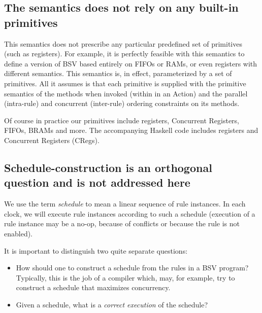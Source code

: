 \documentclass[11pt]{article}
\begin{document}

\subsection{The semantics does not rely on any built-in primitives}

This semantics does not prescribe any particular predefined set of
primitives (such as registers).  For example, it is perfectly feasible
with this semantics to define a version of BSV based entirely on FIFOs
or RAMs, or even registers with different semantics.  This semantics
is, in effect, parameterized by a set of primitives.  All it assumes
is that each primitive is supplied with the primitive semantics of the
methods when invoked (within in an Action) and the parallel
(intra-rule) and concurrent (inter-rule) ordering constraints on its
methods.

Of course in practice our primitives include registers, Concurrent
Registers, FIFOs, BRAMs and more.  The accompanying Haskell code
includes registers and Concurrent Registers (CRegs).


\subsection{Schedule-construction is an orthogonal question and is not addressed here}

\label{sec_schedules}

We use the term \emph{schedule} to mean a linear sequence of rule
instances.  In each clock, we will execute rule instances according to
such a schedule (execution of a rule instance may be a no-op, because
of conflicts or because the rule is not enabled).

It is important to distinguish two quite separate questions:

\begin{itemize}

\item How should one to construct a schedule from the rules in a BSV
program?  Typically, this is the job of a compiler which, may, for
example, try to construct a schedule that maximizes concurrency.

\item Given a schedule, what is a \emph{correct execution} of the schedule?

\end{itemize}
\end{document}
